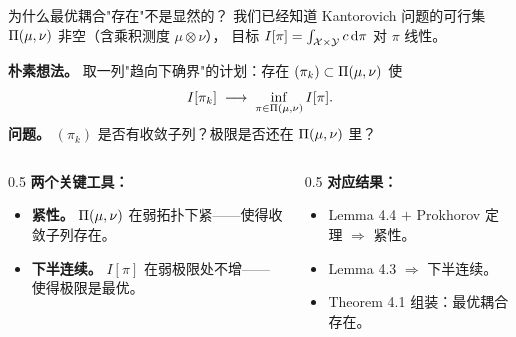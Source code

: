 
\begin{frame}{为什么最优耦合"存在"不是显然的？}
  我们已经知道 Kantorovich 问题的可行集 $\Pi(\mu,\nu)$ 非空（含乘积测度 $\mu\otimes\nu$），
  目标 $I[\pi]=\int_{\mathcal{X}\times\mathcal{Y}} c\,\mathrm{d}\pi$ 对 $\pi$ 线性。

  \textbf{朴素想法。} 取一列"趋向下确界"的计划：存在 $(\pi_k)\subset\Pi(\mu,\nu)$ 使
  \[
    I[\pi_k] \;\longrightarrow\; \inf_{\pi\in\Pi(\mu,\nu)} I[\pi].
  \]
  \textbf{问题。} $(\pi_k)$ 是否有收敛子列？极限是否还在 $\Pi(\mu,\nu)$ 里？

  \begin{columns}[T]
    \begin{column}{0.5\textwidth}
      \textbf{两个关键工具：}
      \begin{itemize}
        \item \textbf{紧性。} $\Pi(\mu,\nu)$ 在弱拓扑下紧——使得收敛子列存在。
        \item \textbf{下半连续。} $I[\pi]$ 在弱极限处不增——使得极限是最优。
      \end{itemize}
    \end{column}
    \begin{column}{0.5\textwidth}
      \textbf{对应结果：}
      \begin{itemize}
        \item Lemma 4.4 $+$ Prokhorov 定理 $\Rightarrow$ 紧性。
        \item Lemma 4.3 $\Rightarrow$ 下半连续。
        \item Theorem 4.1 组装：最优耦合存在。
      \end{itemize}
    \end{column}
  \end{columns}
\end{frame}

